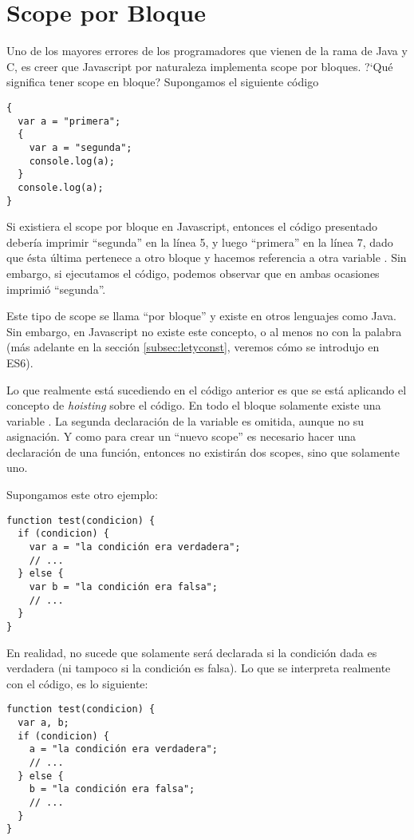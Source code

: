 \section{Scope por Bloque}
\label{sec:scopebloque}

Uno de los mayores errores de los programadores que vienen de la rama de Java y C, es creer que Javascript por naturaleza implementa scope por bloques. ?`Qué significa tener scope en bloque? Supongamos el siguiente código

\begin{lstlisting}
{
  var a = "primera";
  {
    var a = "segunda";
    console.log(a);
  }
  console.log(a);
}
\end{lstlisting}

Si existiera el scope por bloque en Javascript, entonces el código presentado debería imprimir "`segunda"' en la línea 5, y luego "`primera"' en la línea 7, dado que ésta última pertenece a otro bloque y hacemos referencia a otra variable . Sin embargo, si ejecutamos el código, podemos observar que en ambas ocasiones imprimió "`segunda"'.

Este tipo de scope se llama "`por bloque"' y existe en otros lenguajes como Java. Sin embargo, en Javascript no existe este concepto, o al menos no con la palabra  (más adelante en la sección \ref{subsec:letyconst}, veremos cómo se introdujo en ES6).

Lo que realmente está sucediendo en el código anterior es que se está aplicando el concepto de \textit{hoisting} sobre el código. En todo el bloque solamente existe una variable . La segunda declaración de la variable es omitida, aunque no su asignación. Y como para crear un "`nuevo scope"' es necesario hacer una declaración de una función, entonces no existirán dos scopes, sino que solamente uno.

Supongamos este otro ejemplo:

\begin{lstlisting}
function test(condicion) {
  if (condicion) {
    var a = "la condición era verdadera";
    // ...
  } else {
    var b = "la condición era falsa";
    // ...
  }
}
\end{lstlisting}

En realidad, no sucede que  solamente será declarada si la condición dada es verdadera (ni tampoco  si la condición es falsa). Lo que se interpreta realmente con el código, es lo siguiente:

\begin{lstlisting}
function test(condicion) {
  var a, b;
  if (condicion) {
    a = "la condición era verdadera";
    // ...
  } else {
    b = "la condición era falsa";
    // ...
  }
}
\end{lstlisting}

